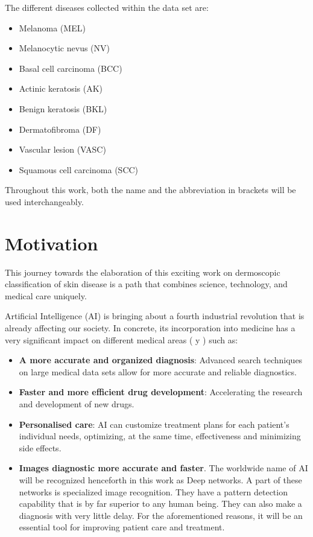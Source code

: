 The different diseases collected within the data set are: 

\begin{itemize}
    \item Melanoma (MEL)
    \item Melanocytic nevus (NV)
    \item Basal cell carcinoma (BCC)
    \item Actinic keratosis (AK)
    \item Benign keratosis (BKL)
    \item Dermatofibroma (DF)
    \item Vascular lesion (VASC)
    \item Squamous cell carcinoma (SCC)
\end{itemize}

Throughout this work, both the name and the abbreviation in brackets will be used interchangeably.

\section{Motivation}

This journey towards the elaboration of this exciting work on dermoscopic classification of skin disease is a path that combines science, technology, and medical care uniquely. 

Artificial Intelligence (AI) is bringing about a fourth industrial revolution that is already affecting our society. In concrete, its incorporation into medicine has a very significant impact on different medical areas (\cite{luciaclemares_que_2023} y \cite{apd_aplicaciones_IA_Medicina}) such as:

\begin{itemize}
    \item \textbf{A more accurate and organized diagnosis}: Advanced search techniques on large medical data sets allow for more accurate and reliable diagnostics. 
    \item \textbf{Faster and more efficient drug development}: Accelerating the research and development of new drugs.
    \item \textbf{Personalised care}: AI can customize treatment plans for each patient's individual needs, optimizing, at the same time, effectiveness and minimizing side effects.
    \item \textbf{Images diagnostic more accurate and faster}. The worldwide name of AI will be recognized henceforth in this work as Deep networks. A part of these networks is specialized image recognition. They have a pattern detection capability that is by far superior to any human being. They can also make a diagnosis with very little delay. For the aforementioned reasons, it will be an essential tool for improving patient care and treatment. 
\end{itemize}


